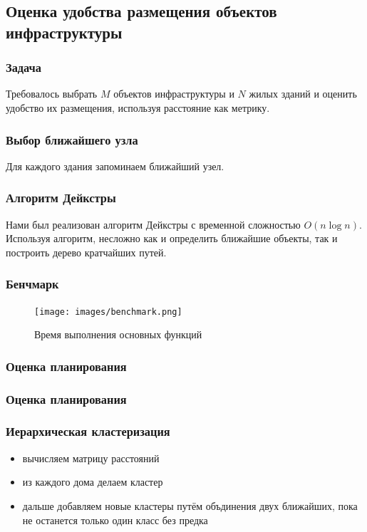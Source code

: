 \documentclass{beamer}
\begin{document}
\subsection{Оценка удобства размещения объектов инфраструктуры}
\begin{frame}
\frametitle{Задача}
Требовалось выбрать $ M $ объектов инфраструктуры и $ N $ жилых зданий и оценить удобство их размещения, используя расстояние как метрику.

\end{frame}
    
\begin{frame}
\frametitle{Выбор ближайшего узла}
Для каждого здания запоминаем ближайший узел.

\end{frame}

\begin{frame}
\frametitle{Алгоритм Дейкстры}
Нами был реализован алгоритм Дейкстры с временной сложностью $ O(n \log n) $.\\
Используя алгоритм, несложно как и определить ближайшие объекты, так и построить дерево кратчайших путей.
\end{frame}

\begin{frame}
\frametitle{Бенчмарк}
\begin{figure}[ht]
\centering	
\texttt{[image: images/benchmark.png]}
\caption{Время выполнения основных функций}
\label{fig:bbbike}
\end{figure}
\end{frame}

\begin{frame}
\frametitle{Оценка планирования}

\end{frame}

\begin{frame}
\frametitle{Оценка планирования}

\end{frame}

\begin{frame}
	\frametitle{Иерархическая кластеризация}
	\begin{itemize}
		\item вычисляем матрицу расстояний
		\item из каждого дома делаем кластер
		\item дальше добавляем новые кластеры путём объдинения двух ближайших, пока не останется только один класс без предка
	\end{itemize}
\end{frame}
\end{document}
